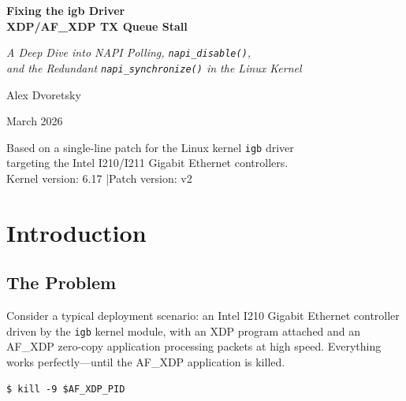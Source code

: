 \documentclass[11pt,a4paper,openany]{book}
\begin{document}
\begin{titlepage}
\centering
\vspace*{2cm}
{\Huge\bfseries Fixing the igb Driver\\[0.3em]
XDP/AF\_XDP TX Queue Stall\par}
\vspace{1.5cm}
{\Large\itshape A Deep Dive into NAPI Polling, \texttt{napi\_disable()},\\
and the Redundant \texttt{napi\_synchronize()} in the Linux Kernel\par}
\vspace{2cm}
{\Large Alex Dvoretsky\par}
\vspace{1cm}
{\large March 2026\par}
\vfill
{\normalsize
Based on a single-line patch for the Linux kernel \texttt{igb} driver\\
targeting the Intel I210/I211 Gigabit Ethernet controllers.\\[1em]
Kernel version: 6.17 \quad|\quad Patch version: v2}
\end{titlepage}

\frontmatter
\tableofcontents

\mainmatter

\chapter{Introduction}
\label{ch:intro}

\section{The Problem}

Consider a typical deployment scenario: an Intel I210 Gigabit Ethernet
controller driven by the \texttt{igb} kernel module, with an XDP program
attached and an AF\_XDP zero-copy application processing packets at high
speed.  Everything works perfectly---until the AF\_XDP application is
killed.

\begin{lstlisting}[style=shellstyle]
$ kill -9 $AF_XDP_PID
\end{lstlisting}
\end{document}
